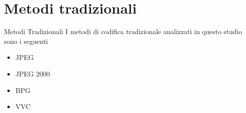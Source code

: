 \section{Metodi tradizionali}

    \begin{frame}{Metodi Tradizionali}
        I metodi di codifica tradizionale analizzati in questo studio sono i seguenti
        \begin{itemize}
            \item JPEG\footnotemark[1]
            \item JPEG 2000\footnotemark[2]
            \item BPG\footnotemark[3]
            \item VVC\footnotemark[4]
        \end{itemize}
    \end{frame}
    